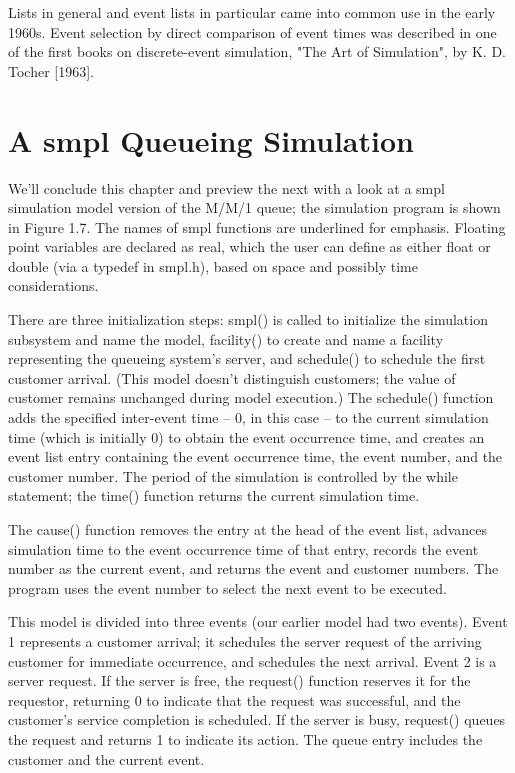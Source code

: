 Lists in general and event lists in particular came into common use in the
early 1960s. Event selection by direct comparison of event times was described
in one of the first books on discrete-event simulation, "The Art of
Simulation", by K. D. Tocher [1963].

\section{A smpl Queueing Simulation}
\label{sec:smpl-queueing-simulation}

We'll conclude this chapter and preview the next with a look at a smpl
simulation model version of the M/M/1 queue; the simulation program is shown in
Figure 1.7. The names of smpl functions are underlined for emphasis. Floating
point variables are declared as real, which the user can define as either float
or double (via a typedef in smpl.h), based on space and possibly time
considerations.

There are three initialization steps: smpl() is called to initialize the
simulation subsystem and name the model, facility() to create and name a
facility representing the queueing system's server, and schedule() to schedule
the first customer arrival. (This model doesn't distinguish customers; the
value of customer remains unchanged during model execution.) The schedule()
function adds the specified inter-event time -- 0, in this case -- to the
current simulation time (which is initially 0) to obtain the event occurrence
time, and creates an event list entry containing the event occurrence time, the
event number, and the customer number. The period of the simulation is
controlled by the while statement; the time() function returns the current
simulation time.

The cause() function removes the entry at the head of the event list, advances
simulation time to the event occurrence time of that entry, records the event
number as the current event, and returns the event and customer numbers. The
program uses the event number to select the next event to be executed.

This model is divided into three events (our earlier model had two events).
Event 1 represents a customer arrival; it schedules the server request of the
arriving customer for immediate occurrence, and schedules the next arrival.
Event 2 is a server request. If the server is free, the request() function
reserves it for the requestor, returning 0 to indicate that the request was
successful, and the customer's service completion is scheduled. If the server
is busy, request() queues the request and returns 1 to indicate its action. The
queue entry includes the customer and the current event.


